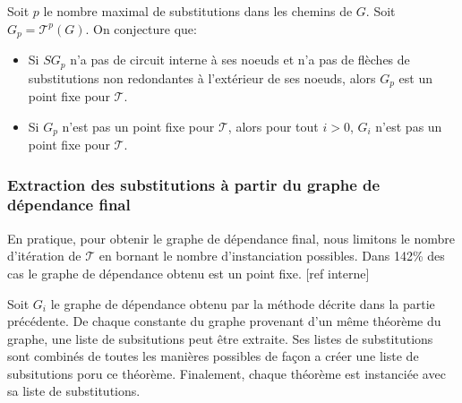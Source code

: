 \begin{conjecture}
Soit $p$ le nombre maximal de substitutions dans les chemins de $G$. Soit $G_p = \mathcal{T}^p(G)$. On conjecture que:
\begin{itemize}
\item Si $SG_p$ n'a pas de circuit interne à ses noeuds et n'a pas de flèches de substitutions non redondantes à l'extérieur de ses noeuds, alors $G_p$ est un point fixe pour $\mathcal{T}$. 
\item Si $G_p$ n'est pas un point fixe pour $\mathcal{T}$, alors pour tout $i>0$, $G_i$ n'est pas un point fixe pour $\mathcal{T}$.
\end{itemize}
\end{conjecture} 

\subsubsection{Extraction des substitutions à partir du graphe de dépendance final}

\par En pratique, pour obtenir le graphe de dépendance final, nous limitons le nombre d'itération de $\mathcal{T}$ en bornant le nombre d'instanciation possibles. Dans {\color{red}142}\% des cas le graphe de dépendance obtenu est un point fixe. [ref interne]
\par Soit $G_i$ le graphe de dépendance obtenu par la méthode décrite dans la partie précédente. De chaque constante du graphe provenant d'un m\^eme théorème du graphe, une liste de subsitutions peut \^etre extraite. Ses listes de substitutions sont combinés de toutes les manières possibles de façon a créer une liste de subsitutions poru ce théorème. Finalement, chaque théorème est instanciée avec sa liste de substitutions. 



